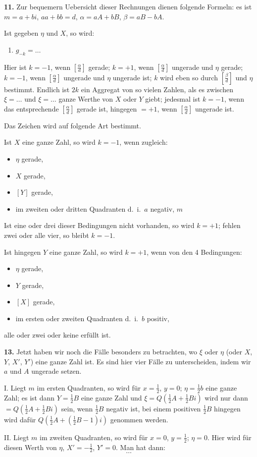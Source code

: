 \documentclass[12pt,a4paper]{article}
\begin{document}
\textbf{11.} Zur bequemern Uebersicht dieser Rechnungen dienen folgende Formeln:
es ist $m = a + bi$, $aa + bb = d$, $\alpha = aA + bB$, $\beta = aB - bA$.

Ist gegeben $\eta$ und $X$, so wird:
\begin{enumerate}
\item $g_{-k} = \ldots$
\end{enumerate}

Hier ist $k = -1$, wenn $[\frac{\alpha}{d}]$ gerade; $k = +1$, wenn $[\frac{\alpha}{d}]$ ungerade und $\eta$ gerade;
$k = -1$, wenn $[\frac{\alpha}{d}]$ ungerade und $\eta$ ungerade ist; $k$ wird eben so durch $[\frac{\beta}{d}]$ und $\eta$
bestimmt. Endlich ist $2k$ ein Aggregat von so vielen Zahlen, als es zwischen $\xi = \ldots$ und
$\xi = \ldots$ ganze Werthe von $X$ oder $Y$ giebt; jedesmal ist $k = -1$, wenn das entsprechende
$[\frac{\alpha}{d}]$ gerade ist, hingegen $= +1$, wenn $[\frac{\alpha}{d}]$ ungerade ist.

Das Zeichen wird auf folgende Art bestimmt.

Ist $X$ eine ganze Zahl, so wird $k = -1$, wenn zugleich:
\begin{itemize}
\item $\eta$ gerade,
\item $X$ gerade,
\item $[Y]$ gerade,
\item im zweiten oder dritten Quadranten d.~i.~$a$ negativ, $m$ 
\end{itemize}
Ist eine oder drei dieser Bedingungen nicht vorhanden, so wird $k = +1$; fehlen zwei oder
alle vier, so bleibt $k = -1$.

Ist hingegen $Y$ eine ganze Zahl, so wird $k = +1$, wenn von den 4 Bedingungen:
\begin{itemize}
\item $\eta$ gerade,
\item $Y$ gerade,
\item $[X]$ gerade,
\item im ersten oder zweiten Quadranten d.~i.~$b$ positiv,
\end{itemize}
alle oder zwei oder keine erfüllt ist.

\textbf{13.} Jetzt haben wir noch die Fälle besonders zu betrachten, wo $\xi$ oder $\eta$ (oder $X$, $Y$,
$X'$, $Y'$) eine ganze Zahl ist. Es sind hier vier Fälle zu unterscheiden, indem wir $a$ und $A$ ungerade
setzen.

I. Liegt $m$ im ersten Quadranten, so wird für $x = \frac{1}{2}$, $y = 0$; $\eta = \frac{1}{2}b$ eine ganze
Zahl; es ist dann $Y = \frac{1}{2}B$ eine ganze Zahl und $\xi = Q(\frac{1}{2}A + \frac{1}{2}Bi)$ wird nur dann $= Q(\frac{1}{2}A + \frac{1}{2}Bi)$
sein, wenn $\frac{1}{2}B$ negativ ist, bei einem positiven $\frac{1}{2}B$ hingegen wird dafür $Q(\frac{1}{2}A + (\frac{1}{2}B - 1)i)$
genommen werden.

II. Liegt $m$ im zweiten Quadranten, so wird für $x = 0$, $y = \frac{1}{2}$; $\eta = 0$. Hier wird für
diesen Werth von $\eta$, $X' = -\frac{1}{2}$, $Y' = 0$. Man hat dann:
\[
\ldots
\]
\end{document}
